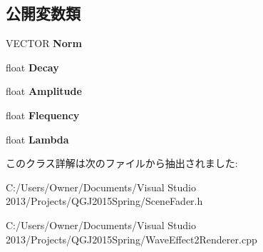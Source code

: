 \subsection*{公開変数類}
\begin{DoxyCompactItemize}
\item 
V\+E\+C\+T\+OR {\bfseries Norm}\hypertarget{class_wave_effect2_renderer_aee0a677914959e09767cadbbb59e1120}{}\label{class_wave_effect2_renderer_aee0a677914959e09767cadbbb59e1120}

\item 
float {\bfseries Decay}\hypertarget{class_wave_effect2_renderer_a4a390a9940d8d7530597665015f5251f}{}\label{class_wave_effect2_renderer_a4a390a9940d8d7530597665015f5251f}

\item 
float {\bfseries Amplitude}\hypertarget{class_wave_effect2_renderer_aa0c819d2f00adff503e7c948ef682065}{}\label{class_wave_effect2_renderer_aa0c819d2f00adff503e7c948ef682065}

\item 
float {\bfseries Flequency}\hypertarget{class_wave_effect2_renderer_a78ab2ba127d5352b55f2f2b11399ad84}{}\label{class_wave_effect2_renderer_a78ab2ba127d5352b55f2f2b11399ad84}

\item 
float {\bfseries Lambda}\hypertarget{class_wave_effect2_renderer_a1b859bbaa0c4e53fd42bdb78c4e0f28f}{}\label{class_wave_effect2_renderer_a1b859bbaa0c4e53fd42bdb78c4e0f28f}

\end{DoxyCompactItemize}


このクラス詳解は次のファイルから抽出されました\+:\begin{DoxyCompactItemize}
\item 
C\+:/\+Users/\+Owner/\+Documents/\+Visual Studio 2013/\+Projects/\+Q\+G\+J2015\+Spring/Scene\+Fader.\+h\item 
C\+:/\+Users/\+Owner/\+Documents/\+Visual Studio 2013/\+Projects/\+Q\+G\+J2015\+Spring/Wave\+Effect2\+Renderer.\+cpp\end{DoxyCompactItemize}
